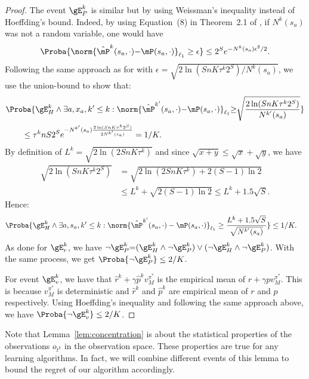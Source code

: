 \begin{subappendices}
\begin{proof}
    The event $\gE^{k}_P$ is similar but by using Weissman's inequality \cite{weissman2003inequalities} instead of Hoeffding's bound. Indeed, by using Equation~(8) in Theorem~2.1 of \cite{weissman2003inequalities}, if $N^{k}(s_a)$ was not a random variable, one would have 
    \begin{align*}
        \Proba{\norm{\hat{\mP}^{k}(s_a,\cdot){-}\mP(s_a,\cdot)}_{\ell_1}\ge \epsilon} \le 2^S e^{- N^{k}(s_a) \epsilon^2/2}.
    \end{align*}
    Following the same approach as for  with $\epsilon=\sqrt{2\ln(SnK\tau^k2^S)/N^{k}(s_a)}$, we use the union-bound to show that:
    \begin{align*}
        &\Proba{\gE^{k}_H\land\exists a, x_a, k'\le k: \norm{\hat{\mP}^{k'}(s_a,\cdot){-}\mP(s_a,\cdot)}_{\ell_1} {\ge} \sqrt{\frac{2\ln(SnK\tau^k 2^S)}{N^{k'}(s_a)}}} \\
        &\qquad \le \tau^k n S 2^Se^{ -N^{k'}(s_a)\frac{2\ln(SnK\tau^k2^S)}{2N^{k'}(s_a)}} = 1/K.
    \end{align*}
    By definition of $L^{k}=\sqrt{2\ln(2SnK\tau^k)}$ and since $\sqrt{x+y}\le\sqrt{x}+\sqrt{y}$, we have
    \begin{align*}
      \sqrt{2\ln(SnK\tau^k2^S)}
      &=\sqrt{2\ln(2SnK\tau^k) {+} 2(S-1)\ln 2}\\
      & \le L^{k} +\sqrt{2(S-1)\ln2} \le L^{k} + 1.5\sqrt{S}.
    \end{align*}
    Hence: 
    \begin{align*}
        &\Proba{\gE^{k}_H\land\exists a, s_a, k'\le k: \norm{\hat{\mP}^{k'}(s_a,\cdot)-\mP(s_a,\cdot)}_{\ell_1} \ge \frac{L^{k}+1.5\sqrt{S}}{\sqrt{N^{k'}(s_a)}}} \le 1/K.
    \end{align*}
    As done for $\gE_r^{k}$, we have $\lnot \gE^{k}_P {=}(\gE^{k}_H \land \lnot \gE^{k}_P) \lor (\lnot \gE^{k}_H \land \lnot \gE^{k}_P)$. With the same process, we get $\Proba{\lnot \gE^{k}_P}\le 2/K$.
        
    For event $\gE^{k}_v$, we have that $\hat{r}^{k}+\gamma\hat{p}^{k}v_M^{\pi^*}$ is the empirical mean of $r+\gamma p v_M^{\pi^*}$.
    This is because $v_M^{\pi^*}$ is deterministic and $\hat{r}^{k}$ and $\hat{p}^{k}$ are empirical mean of $r$ and $p$ respectively.
    Using Hoeffding's inequality and following the same approach above, we have $\Proba{\neg \gE^{k}_v}\le 2/K$.
\end{proof}
Note that Lemma~\ref{lem:concentration} is about the statistical properties of the observations $o_{t^k}$ in the observation space.
These properties are true for any learning algorithms.
In fact, we will combine different events of this lemma to bound the regret of our algorithm accordingly.


\end{subappendices}
